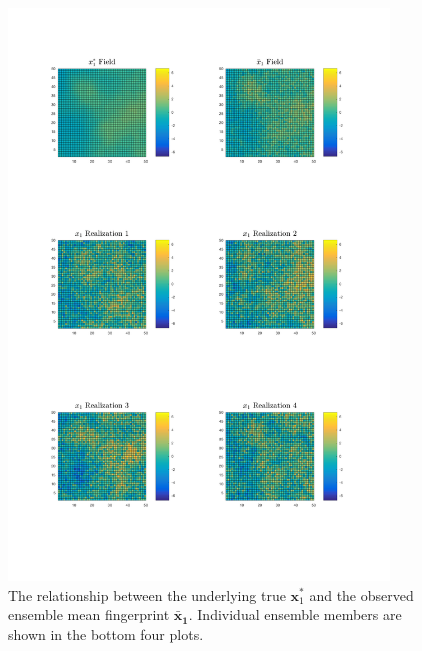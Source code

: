 \documentclass[12pt]{article}
\def\*#1{\bm{#1}}
\begin{document}
\begin{figure}[htbp]
\begin{center}
\includegraphics[width=0.9\textwidth]{figures/xgeneration1.png}
\caption{The relationship between the underlying true $\*x^*_1$ and the observed ensemble mean fingerprint $ \*{\bar x_1}$. Individual ensemble members are shown in the bottom four plots.}
\label{fig:xfield1}
\end{center}
\end{figure}
\end{document}
